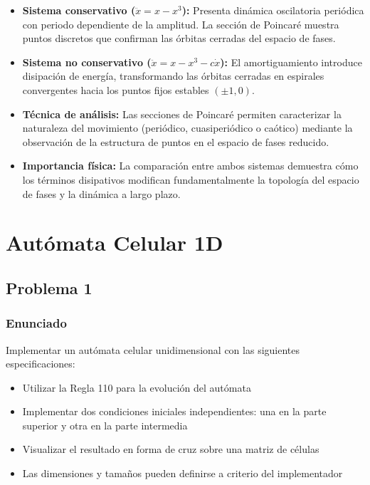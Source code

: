 \documentclass[a4paper,12pt]{article}
\theoremstyle{mytheor}
\begin{document}
\begin{itemize}
    \item \textbf{Sistema conservativo ($\ddot{x} = x - x^3$):} Presenta dinámica oscilatoria periódica con periodo dependiente de la amplitud. La sección de Poincaré muestra puntos discretos que confirman las órbitas cerradas del espacio de fases.
    
    \item \textbf{Sistema no conservativo ($\ddot{x} = x - x^3 - c\dot{x}$):} El amortiguamiento introduce disipación de energía, transformando las órbitas cerradas en espirales convergentes hacia los puntos fijos estables $(\pm 1, 0)$.
    
    \item \textbf{Técnica de análisis:} Las secciones de Poincaré permiten caracterizar la naturaleza del movimiento (periódico, cuasiperiódico o caótico) mediante la observación de la estructura de puntos en el espacio de fases reducido.
    
    \item \textbf{Importancia física:} La comparación entre ambos sistemas demuestra cómo los términos disipativos modifican fundamentalmente la topología del espacio de fases y la dinámica a largo plazo.
\end{itemize}

\newpage

\section{Autómata Celular 1D}

\subsection{Problema 1}
\subsubsection{Enunciado}
Implementar un autómata celular unidimensional con las siguientes especificaciones:

\begin{itemize}
    \item Utilizar la Regla 110 para la evolución del autómata
    \item Implementar dos condiciones iniciales independientes: una en la parte superior y otra en la parte intermedia
    \item Visualizar el resultado en forma de cruz sobre una matriz de células
    \item Las dimensiones y tamaños pueden definirse a criterio del implementador
\end{itemize}
\end{document}

